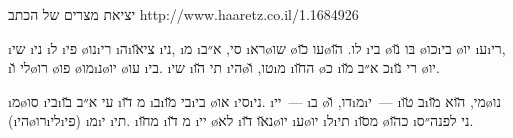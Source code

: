 יציאת מצרים של הכתב 
http://www.haaretz.co.il/1.1684926

\i{שי}  \i{ני} \i{ל} \i{פי} \o{נו}\i{רי} \i{ה}\i{צי}\u{או} \i{ני}, \i{מ} \i{סי},  א״ב \i{רא}\o{שו} \o{עו} \u{כו}\o{לו}. \u{הו} \i{בי}  \o{בּו} \u{נו} \o{כו}\i{בי}  \o{יו} \i{ע}\i{רי}, \i{לי} \u{ו}\o{רו} \o{פו} \o{מו}\i{נ}\o{יו}  \o{עו} \i{בי}. \i{שי} \i{תי} \u{הו}     \i{הי}\o{טו}, \u{ו}\i{מ} \i{ה}\u{חו} \o{כ} \i{כ} א״ב \u{מו}\i{רי} \u{נו} \o{יו}.

\i{מ}\o{סו}  \i{בי}\i{עי}   א״ב \u{בו} \i{מ} \u{דו} \i{ב}\i{בי} \u{מו}\i{בי}  \o{או} \i{סי}\i{ני}.  \i{יי}~— \i{ב} \o{דו}, \u{ו}\i{מ}\i{י}~— \i{ב} \u{טו}\i{מי}, \u{הוא}  \u{מו}\o{נו} (\i{הי}\o{רו}\i{לי}\i{פי})  \i{מ}\i{י} \i{תי}. \i{מ}\u{חו} \i{מ} \u{דו} \i{יי} \o{לא} \i{נ}\u{או} \u{דו}\o{יו}  \i{ע}\o{יו} \i{ל}\i{תי} \i{מ}\u{סו} \o{כ}\u{הו}   \i{ני} לפנה״ס.

